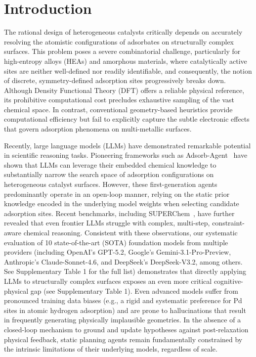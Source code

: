 \documentclass{article}
\begin{document}
\section{Introduction}
The rational design of heterogeneous catalysts critically depends on accurately resolving the atomistic configurations of adsorbates on structurally complex surfaces. This problem poses a severe combinatorial challenge, particularly for high-entropy alloys (HEAs) and amorphous materials, where catalytically active sites are neither well-defined nor readily identifiable, and consequently, the notion of discrete, symmetry-defined adsorption sites progressively breaks down. Although Density Functional Theory (DFT) offers a reliable physical reference, its prohibitive computational cost precludes exhaustive sampling of the vast chemical space. In contrast, conventional geometry-based heuristics provide computational efficiency but fail to explicitly capture the subtle electronic effects that govern adsorption phenomena on multi-metallic surfaces.

Recently, large language models (LLMs) have demonstrated remarkable potential in scientific reasoning tasks. Pioneering frameworks such as Adsorb-Agent~\cite{ock2024adsorbagent} have shown that LLMs can leverage their embedded chemical knowledge to substantially narrow the search space of adsorption configurations on heterogeneous catalyst surfaces. However, these first-generation agents predominantly operate in an open-loop manner, relying on the static prior knowledge encoded in the underlying model weights when selecting candidate adsorption sites. Recent benchmarks, including SUPERChem~\cite{zhao2025superchem}, have further revealed that even frontier LLMs struggle with complex, multi-step, constraint-aware chemical reasoning. Consistent with these observations, our systematic evaluation of 10 state-of-the-art (SOTA) foundation models from multiple providers (including OpenAI's GPT-5.2, Google's Gemini-3.1-Pro-Preview, Anthropic's Claude-Sonnet-4.6, and DeepSeek's DeepSeek-V3.2, among others. See Supplementary Table 1 for the full list) demonstrates that directly applying LLMs to structurally complex surfaces exposes an even more critical cognitive-physical gap (see Supplementary Table 1). Even advanced models suffer from pronounced training data biases (e.g., a rigid and systematic preference for Pd sites in atomic hydrogen adsorption) and are prone to hallucinations that result in frequently generating physically implausible geometries. In the absence of a closed-loop mechanism to ground and update hypotheses against post-relaxation physical feedback, static planning agents remain fundamentally constrained by the intrinsic limitations of their underlying models, regardless of scale.
\end{document}
